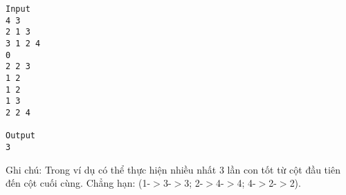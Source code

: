 \begin{verbatim}
Input
4 3 
2 1 3 
3 1 2 4
0
2 2 3 
1 2 
1 2 
1 3 
2 2 4 

Output
3
\end{verbatim}

   Ghi chú: Trong ví dụ có thể thực hiện nhiều nhất 3 lần con tốt từ cột đầu tiên đến cột cuối cùng. Chẳng hạn: (1-$>$3-$>$3; 2-$>$4-$>$4; 4-$>$2-$>$2).